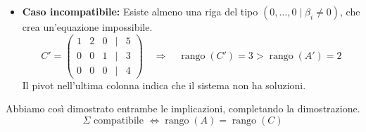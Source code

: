 {{\begin{itemize}
            \item \textbf{Caso incompatibile:}  
            Esiste almeno una riga del tipo \((0, \dots, 0 \mid \beta_i \neq 0)\), che crea un'equazione impossibile.  
            \[
                C' = 
                \begin{pmatrix}
                1 & 2 & 0 & | & 5 \\
                0 & 0 & 1 & | & 3 \\
                0 & 0 & 0 & | & 4
                \end{pmatrix}
                \quad \Rightarrow \quad
                \operatorname{rango}(C') = 3 > \operatorname{rango}(A') = 2
            \]
            Il pivot nell'ultima colonna indica che il sistema non ha soluzioni.
        \end{itemize}
        
        Abbiamo così dimostrato entrambe le implicazioni, completando la dimostrazione.
        \[
            \Sigma \text{ compatibile } \iff \operatorname{rango}(A) = \operatorname{rango}(C)
        \]
    }
}



